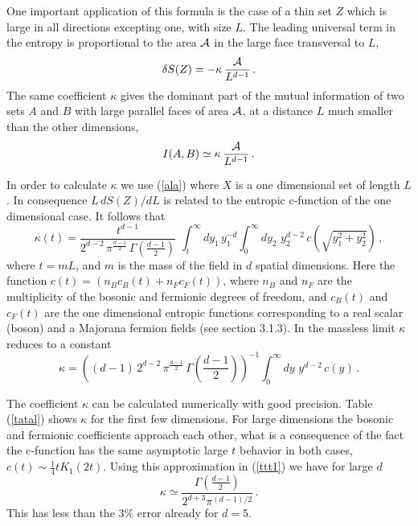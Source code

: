 \documentclass[a4paper]{article}
\begin{document}
One important application of this formula is the case of a thin set $Z$ which is large in all directions excepting one, with size $L$. The leading universal term in the entropy is proportional to the area ${\cal A}$ in the large face transversal to $L$,
 \begin{equation}
\delta S(Z)= -\kappa\, \frac{{\cal A}}{L^{d-1}}\,.\label{tuy}
\end{equation}
The same coefficient $\kappa$ gives the dominant part of the mutual information of two sets $A$ and $B$ with large parallel faces of area ${\cal A}$, at a distance $L$ much smaller than the other dimensions,  
\begin{equation}
I(A,B)\simeq \kappa\, \frac{{\cal A}}{L^{d-1}}\,.\label{tuy1}
\end{equation}

In order to calculate $\kappa$ we use (\ref{ala}) where $X$ is a one dimensional set of length $L$. In consequence $L\,dS(Z)/dL$ is related to the entropic c-function of the one dimensional case. It follows that
\begin{equation}
\kappa(t) =   \frac{ t^{d-1}}{2^{d-2}\,\pi^{\frac{d-1}{2}}\,\Gamma\left(\frac{d-1}{2}\right)}\,\,\int_t^\infty dy_1\, y_1^{-d} \int_0^\infty d y_2\, \, y_2^{d-2}\, c\left(\sqrt{y_1^2+y_2^2}\right)\,,\label{masapan}
\end{equation}
where $t=m L$, and $m$ is the mass of the field in $d$ spatial dimensions.  Here the function $c(t)=(n_B c_B(t)+n_F c_F(t))$, where $n_B$ and $n_F$ are the multiplicity of the bosonic and fermionic degrees of freedom, and $c_B(t)$ and $c_F(t)$ are the one dimensional entropic functions corresponding to a real scalar (boson) and a Majorana fermion fields (see section 3.1.3). In the massless limit $\kappa$ reduces to a constant  
\begin{equation}
\kappa =  \left( (d-1)\,2^{d-2}\,\pi^{\frac{d-1}{2}}\,\Gamma\left(\frac{d-1}{2}\right)\right)^{-1} \int_0^\infty dy \,\,y^{d-2}\, c(y) \,.\label{ttt1}
\end{equation}


The coefficient $\kappa$ can be calculated numerically with good precision. Table (\ref{tatal}) shows $\kappa$ for the first few dimensions. For large dimensions the bosonic and fermionic coefficients approach each other, what is a consequence of the fact the c-function has the same asymptotic large $t$ behavior in both cases, $c(t)\sim \frac{1}{4} t K_1(2 t)$. Using this approximation in (\ref{ttt1}) we have for large $d$
\begin{equation}
\kappa\simeq \frac{\Gamma\left(\frac{d-1}{2}\right)}{2^{d+3}\pi^{(d-1)/2}}\,.
\end{equation} 
This has less than the 3\% error already for $d=5$.
\end{document}
